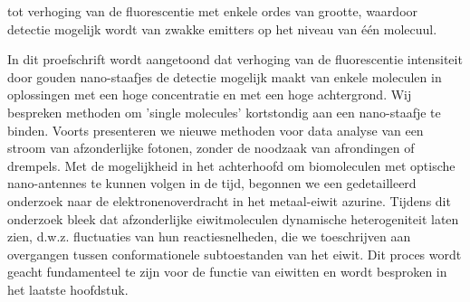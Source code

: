 tot verhoging van de fluorescentie met enkele ordes van grootte, waardoor detectie mogelijk wordt van zwakke emitters op het niveau van één molecuul. 


In dit proefschrift wordt aangetoond dat verhoging van de fluorescentie intensiteit door gouden nano-staafjes de detectie mogelijk maakt van enkele moleculen in oplossingen met een hoge concentratie en met een hoge achtergrond. Wij bespreken methoden om ’single molecules’ kortstondig aan een nano-staafje te binden. Voorts presenteren we nieuwe methoden voor data analyse van een stroom van afzonderlijke fotonen, zonder de noodzaak van afrondingen of drempels. Met de mogelijkheid in het achterhoofd om biomoleculen met optische nano-antennes te kunnen volgen in de tijd, begonnen we een gedetailleerd onderzoek naar de elektronenoverdracht in het metaal-eiwit azurine. Tijdens dit onderzoek bleek dat afzonderlijke eiwitmoleculen dynamische heterogeniteit laten zien, d.w.z. fluctuaties van hun reactiesnelheden, die we toeschrijven aan overgangen tussen conformationele subtoestanden van het eiwit. Dit proces wordt geacht fundamenteel te zijn voor de functie van eiwitten en wordt besproken in het laatste hoofdstuk.


